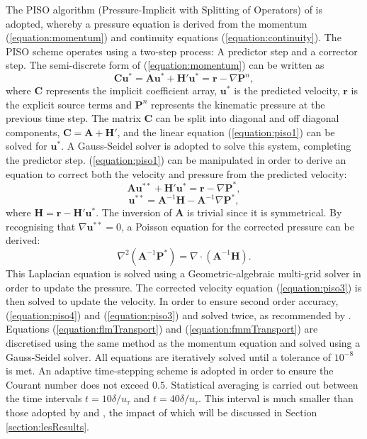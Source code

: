 \documentclass[12pt,oneside,a4paper]{article}
\newcommand{\vect}[1]{\boldsymbol{#1}}
\begin{document}
 The PISO algorithm (Pressure-Implicit with Splitting of Operators) of \cite{issa1986} is adopted, whereby a pressure equation is derived from the momentum (\ref{equation:momentum}) and continuity equations (\ref{equation:continuity}). The PISO scheme operates using a two-step process: A predictor step and a corrector step. The semi-discrete form of (\ref{equation:momentum}) can be written as
\begin{equation}
\label{equation:piso1}
\vect{C} \vect{u}^* =  \vect{A}\vect{u}^* + \vect{H'}\vect{u}^* =\vect{r} - \nabla \vect{P}^n,
\end{equation} 
where $\vect{C}$ represents the implicit coefficient array, $\vect{u}^*$ is the predicted velocity, $\vect{r}$ is the explicit source terms and $\vect{P}^n$ represents the kinematic pressure at the previous time step. The matrix $\vect{C}$ can be split into diagonal and off diagonal components, $\vect{C} = \vect{A} + \vect{H'}$, and the linear equation (\ref{equation:piso1}) can be solved for $\vect{u}^*$. A Gauss-Seidel solver is adopted to solve this system, completing the predictor step. (\ref{equation:piso1}) can be manipulated in order to derive an equation to correct both the velocity and pressure from the predicted velocity:
\begin{equation}
\label{equation:piso2}
\vect{A}\vect{u}^{**} + \vect{H'}\vect{u}^* =\vect{r} - \nabla \vect{P}^*,
\end{equation}
\begin{equation}
\label{equation:piso3}
\vect{u}^{**}  = \vect{A}^{-1}\vect{H} - \vect{A}^{-1}\nabla \vect{P}^*,
\end{equation}
where $\vect{H} = \vect{r} - \vect{H'}\vect{u}^*$. The inversion of $\vect{A}$ is trivial since it is symmetrical. By recognising that $\nabla \vect{u}^{**} = 0$, a Poisson equation for the corrected pressure can be derived:
\begin{equation}
\label{equation:piso4}
\nabla^2 ( \vect{A}^{-1} \vect{P}^* ) = \nabla \cdot (\vect{A}^{-1} \vect{H}).
\end{equation}
This Laplacian equation is solved using a Geometric-algebraic multi-grid solver in order to update the pressure. The corrected velocity equation (\ref{equation:piso3}) is then solved to update the velocity. In order to ensure second order accuracy, (\ref{equation:piso4}) and (\ref{equation:piso3}) and solved twice, as recommended by \cite{issa1986}. Equations (\ref{equation:flmTransport}) and (\ref{equation:fmmTransport}) are discretised using the same method as the momentum equation and solved using a Gauss-Seidel solver. All equations are iteratively solved until a tolerance of $10^{-8}$ is met. An adaptive time-stepping scheme is adopted in order to ensure the Courant number does not exceed $0.5$. Statistical averaging is carried out between the time intervals $t=10 \delta / u_\tau$ and $t = 40 \delta / u_\tau$. This interval is much smaller than those adopted by \cite{kim1987} and \cite{vreman2014}, the impact of which will be discussed in Section \ref{section:lesResults}.
\end{document}
